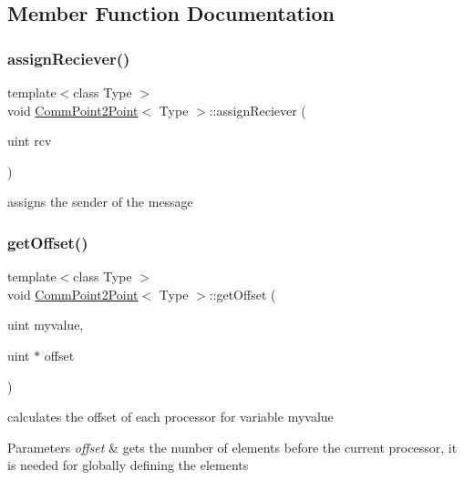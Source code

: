 \subsection{Member Function Documentation}
\mbox{\label{classCommPoint2Point_a0b5ed7ad903ab51aa0429e54bcf6d58e}} 
\subsubsection{\texorpdfstring{assign\+Reciever()}{assignReciever()}}
{\footnotesize\ttfamily template$<$class Type $>$ \\
void \mbox{\hyperlink{classCommPoint2Point}{Comm\+Point2\+Point}}$<$ Type $>$\+::assign\+Reciever (\begin{DoxyParamCaption}\item[{uint}]{rcv }\end{DoxyParamCaption})}

assigns the sender of the message \mbox{\label{classCommPoint2Point_a9093c564a679e5df134859ed3841a84c}} 
\subsubsection{\texorpdfstring{get\+Offset()}{getOffset()}}
{\footnotesize\ttfamily template$<$class Type $>$ \\
void \mbox{\hyperlink{classCommPoint2Point}{Comm\+Point2\+Point}}$<$ Type $>$\+::get\+Offset (\begin{DoxyParamCaption}\item[{uint}]{myvalue,  }\item[{uint $\ast$}]{offset }\end{DoxyParamCaption})}

calculates the offset of each processor for variable myvalue 
\begin{DoxyParams}{Parameters}
{\em offset} & gets the number of elements before the current processor, it is needed for globally defining the elements \\
\hline
\end{DoxyParams}
\mbox{\label{classCommPoint2Point_a91a4f9779a315269bd95543254bfe0ff}} 

